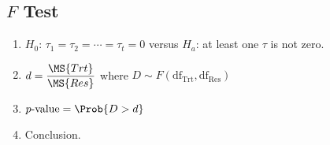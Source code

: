 \subsection*{$F$ Test}
\begin{enumerate}[(1)]
    \item $ H_0 $: $ \tau_1=\tau_2=\cdots=\tau_t=0 $ versus $ H_a $: at least one $\tau$ is not zero.
    \item $ \displaystyle d=\frac{\MS{Trt}}{\MS{Res}}  $ where $ D \sim F(\text{df}_\text{Trt},\text{df}_\text{Res}) $
    \item $ p\text{-value}=\Prob{D>d} $
    \item Conclusion.
\end{enumerate}
